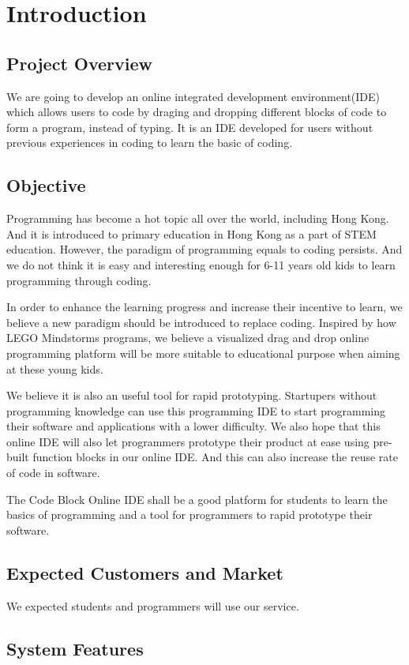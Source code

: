 \documentclass[CSCI3100_Documentation]{subfiles}
\begin{document}
  \chapter{Introduction}
  \section{Project Overview}
  We are going to develop an online integrated development environment(IDE) which allows users to code by draging and dropping different blocks of code to form a program, instead of typing. It is an IDE developed for users without previous experiences in coding to learn the basic of coding.
  \section{Objective}
  Programming has become a hot topic all over the world, including Hong Kong. And it is introduced to primary education in Hong Kong as a part of STEM education. However, the paradigm of programming equals to coding persists. And we do not think it is easy and interesting enough for 6-11 years old kids to learn programming through coding.

  In order to enhance the learning progress and increase their incentive to learn, we believe a new paradigm should be introduced to replace coding. Inspired by how LEGO\textsuperscript{\textregistered} Mindstorms\textsuperscript{\textregistered} programs, we believe a visualized drag and drop online programming platform will be more suitable to educational purpose when aiming at these young kids.

  We believe it is also an useful tool for rapid prototyping. Startupers without programming knowledge can use this programming IDE to start programming their software and applications with a lower difficulty. We also hope that this online IDE will also let programmers prototype their product at ease using pre-built function blocks in our online IDE. And this can also increase the reuse rate of code in software.

  The Code Block Online IDE shall be a good platform for students to learn the basics of programming and a tool for programmers to rapid prototype their software.
  \section{Expected Customers and Market}
  We expected students and programmers will use our service.
  \section{System Features}
\end{document}
